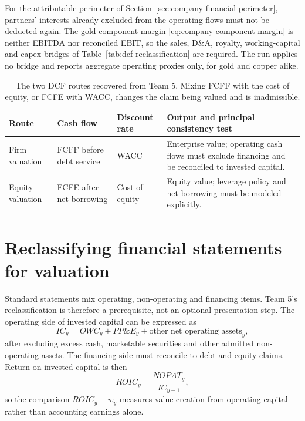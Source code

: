 For the attributable perimeter of Section~\ref{sec:company-financial-perimeter},
partners' interests already excluded from the operating flows must not be
deducted again. The gold component margin \eqref{eq:company-component-margin}
is neither EBITDA nor reconciled EBIT, so the sales, D\&A, royalty,
working-capital and capex bridges of Table~\ref{tab:dcf-reclassification} are
required. The run applies no bridge and reports aggregate operating proxies
only, for gold and copper alike.

\begin{table}[H]
\centering
\small
\begin{tabularx}{\textwidth}{@{}p{2.7cm}p{3.0cm}p{2.8cm}X@{}}
\toprule
Route & Cash flow & Discount rate & Output and principal consistency test \\
\midrule
Firm valuation & FCFF before debt service & WACC & Enterprise value; operating
cash flows must exclude financing and be reconciled to invested capital. \\
Equity valuation & FCFE after net borrowing & Cost of equity & Equity value;
leverage policy and net borrowing must be modeled explicitly. \\
\bottomrule
\end{tabularx}
\caption{The two DCF routes recovered from Team 5. Mixing FCFF with the cost of
equity, or FCFE with WACC, changes the claim being valued and is inadmissible.}
\label{tab:dcf-route-consistency}
\end{table}

\section{Reclassifying financial statements for valuation}

Standard statements mix operating, non-operating and financing items. Team 5's
reclassification is therefore a prerequisite, not an optional presentation
step. The operating side of invested capital can be expressed as
\begin{equation}
IC_y=OWC_y+PP\&E_y+\text{other net operating assets}_y,
\end{equation}
after excluding excess cash, marketable securities and other admitted
non-operating assets. The financing side must reconcile to debt and equity
claims. Return on invested capital is then
\begin{equation}
ROIC_y=\frac{NOPAT_y}{IC_{y-1}},
\end{equation}
so the comparison \(ROIC_y-w_y\) measures value creation from operating
capital rather than accounting earnings alone.

